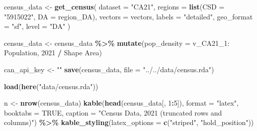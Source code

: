 \documentclass[
]{article}
\newenvironment{Shaded}{\begin{snugshade}}{\end{snugshade}}
\newcommand{\AttributeTok}[1]{\textcolor[rgb]{0.13,0.29,0.53}{#1}}
\newcommand{\ConstantTok}[1]{\textcolor[rgb]{0.56,0.35,0.01}{#1}}
\newcommand{\DecValTok}[1]{\textcolor[rgb]{0.00,0.00,0.81}{#1}}
\newcommand{\FunctionTok}[1]{\textcolor[rgb]{0.13,0.29,0.53}{\textbf{#1}}}
\newcommand{\NormalTok}[1]{#1}
\newcommand{\OtherTok}[1]{\textcolor[rgb]{0.56,0.35,0.01}{#1}}
\newcommand{\SpecialCharTok}[1]{\textcolor[rgb]{0.81,0.36,0.00}{\textbf{#1}}}
\newcommand{\StringTok}[1]{\textcolor[rgb]{0.31,0.60,0.02}{#1}}
\begin{document}
\begin{Shaded}
\begin{Highlighting}[]
\NormalTok{census\_data }\OtherTok{\textless{}{-}} \FunctionTok{get\_census}\NormalTok{(}
  \AttributeTok{dataset =} \StringTok{"CA21"}\NormalTok{,}
  \AttributeTok{regions =} \FunctionTok{list}\NormalTok{(}\AttributeTok{CSD =} \StringTok{"5915022"}\NormalTok{, }\AttributeTok{DA =}\NormalTok{ region\_DA),}
  \AttributeTok{vectors =}\NormalTok{ vectors,}
  \AttributeTok{labels =} \StringTok{"detailed"}\NormalTok{,}
  \AttributeTok{geo\_format =} \StringTok{"sf"}\NormalTok{,}
  \AttributeTok{level =} \StringTok{"DA"}
\NormalTok{)}

\NormalTok{census\_data }\OtherTok{\textless{}{-}}\NormalTok{ census\_data }\SpecialCharTok{\%\textgreater{}\%}
  \FunctionTok{mutate}\NormalTok{(}\AttributeTok{pop\_density =} \StringTok{\textasciigrave{}}\AttributeTok{v\_CA21\_1: Population, 2021}\StringTok{\textasciigrave{}} \SpecialCharTok{/} \StringTok{\textasciigrave{}}\AttributeTok{Shape Area}\StringTok{\textasciigrave{}}\NormalTok{)}

\NormalTok{can\_api\_key }\OtherTok{\textless{}{-}} \StringTok{""}
\FunctionTok{save}\NormalTok{(census\_data, }\AttributeTok{file =} \StringTok{"../../data/census.rda"}\NormalTok{)}
\end{Highlighting}
\end{Shaded}

\begin{Shaded}
\begin{Highlighting}[]
\FunctionTok{load}\NormalTok{(}\FunctionTok{here}\NormalTok{(}\StringTok{"data/census.rda"}\NormalTok{))}

\NormalTok{n }\OtherTok{\textless{}{-}} \FunctionTok{nrow}\NormalTok{(census\_data)}
\FunctionTok{kable}\NormalTok{(}\FunctionTok{head}\NormalTok{(census\_data[, }\DecValTok{1}\SpecialCharTok{:}\DecValTok{5}\NormalTok{]), }\AttributeTok{format =} \StringTok{"latex"}\NormalTok{, }\AttributeTok{booktabs =} \ConstantTok{TRUE}\NormalTok{, }\AttributeTok{caption =} \StringTok{"Census Data, 2021 (truncated rows and columns)"}\NormalTok{) }\SpecialCharTok{\%\textgreater{}\%}
  \FunctionTok{kable\_styling}\NormalTok{(}\AttributeTok{latex\_options =} \FunctionTok{c}\NormalTok{(}\StringTok{"striped"}\NormalTok{, }\StringTok{"hold\_position"}\NormalTok{))}
\end{Highlighting}
\end{Shaded}
\end{document}
